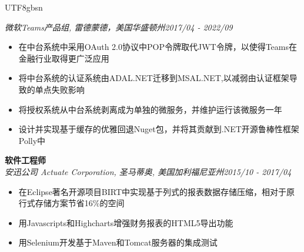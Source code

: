 \documentclass[3pt]{article}
\newenvironment{changemargin}[2]{%
  \begin{list}{}{%
    \setlength{\topsep}{0pt}%
    \setlength{\leftmargin}{#1}%
    \setlength{\rightmargin}{#2}%
    \setlength{\listparindent}{\parindent}%
    \setlength{\itemindent}{\parindent}%
    \setlength{\parsep}{\parskip}%
  }%
  \item[]}{\end{list}
}
\newenvironment{body} {
	\vspace*{-16pt}
	\begin{changemargin}{-0.25in}{-0.5in}
  }	
	{\end{changemargin}
}
\begin{document}
\begin{CJK}{UTF8}{gbsn}
\begin{body}
    \emph{微软Teams产品组, 雷德蒙德，美国华盛顿州}\hfill \emph{2017/04 - 2022/09}\\
     \begin{itemize} \itemsep -0.5pt
	\item {在中台系统中采用OAuth 2.0协议中POP令牌取代JWT令牌，以使得Teams在金融行业取得更广泛应用}
	\item {将中台系统的认证系统由ADAL.NET迁移到MSAL.NET,以减弱由认证框架导致的单点失败影响}
	\item {将授权系统从中台系统剥离成为单独的微服务，并维护运行该微服务一年}
	\item {设计并实现基于缓存的优雅回退Nuget包，并将其贡献到.NET开源鲁棒性框架Polly中}
     \end{itemize}

   \vspace{5pt}

    \textbf{软件工程师} \\
    \emph{安迅公司 Actuate Corporation, 圣马蒂奥, 美国加利福尼亚州}\hfill \emph{2015/10 - 2017/04}\\
     \begin{itemize} \itemsep -0.5pt
	\item {在Eclipse著名开源项目BIRT中实现基于列式的报表数据存储压缩，相对于原行式存储方案节省16\%的空间}
     \item {用Javascripts和Highcharts增强财务报表的HTML5导出功能}
	\item {用Selenium开发基于Maven和Tomcat服务器的集成测试} 
       \end{itemize}
	

\end{body}
\end{CJK}
\end{document}
